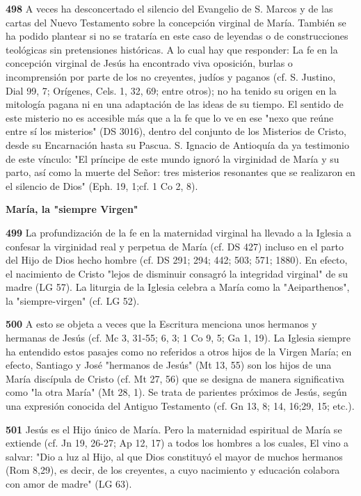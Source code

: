 \documentclass[]{article}
\begin{document}
\textbf{498} A veces ha desconcertado el silencio del Evangelio de S.
Marcos y de las cartas del Nuevo Testamento sobre la concepción virginal
de María. También se ha podido plantear si no se trataría en este caso
de leyendas o de construcciones teológicas sin pretensiones históricas.
A lo cual hay que responder: La fe en la concepción virginal de Jesús ha
encontrado viva oposición, burlas o incomprensión por parte de los no
creyentes, judíos y paganos (cf. S. Justino, Dial 99, 7; Orígenes, Cels.
1, 32, 69; entre otros); no ha tenido su origen en la mitología pagana
ni en una adaptación de las ideas de su tiempo. El sentido de este
misterio no es accesible más que a la fe que lo ve en ese "nexo que
reúne entre sí los misterios" (DS 3016), dentro del conjunto de los
Misterios de Cristo, desde su Encarnación hasta su Pascua. S. Ignacio de
Antioquía da ya testimonio de este vínculo: "El príncipe de este mundo
ignoró la virginidad de María y su parto, así como la muerte del Señor:
tres misterios resonantes que se realizaron en el silencio de Dios"
(Eph. 19, 1;cf. 1 Co 2, 8).\textbf{\\
}

\textbf{María, la "siempre Virgen"}

\textbf{499} La profundización de la fe en la maternidad virginal ha
llevado a la Iglesia a confesar la virginidad real y perpetua de María
(cf. DS 427) incluso en el parto del Hijo de Dios hecho hombre (cf. DS
291; 294; 442; 503; 571; 1880). En efecto, el nacimiento de Cristo
"lejos de disminuir consagró la integridad virginal" de su madre (LG
57). La liturgia de la Iglesia celebra a María como la "Aeiparthenos",
la "siempre-virgen" (cf. LG 52).

\textbf{500} A esto se objeta a veces que la Escritura menciona unos
hermanos y hermanas de Jesús (cf. Mc 3, 31-55; 6, 3; 1 Co 9, 5; Ga 1,
19). La Iglesia siempre ha entendido estos pasajes como no referidos a
otros hijos de la Virgen María; en efecto, Santiago y José "hermanos de
Jesús" (Mt 13, 55) son los hijos de una María discípula de Cristo (cf.
Mt 27, 56) que se designa de manera significativa como "la otra María"
(Mt 28, 1). Se trata de parientes próximos de Jesús, según una expresión
conocida del Antiguo Testamento (cf. Gn 13, 8; 14, 16;29, 15; etc.).

\textbf{501} Jesús es el Hijo único de María. Pero la maternidad
espiritual de María se extiende (cf. Jn 19, 26-27; Ap 12, 17) a todos
los hombres a los cuales, El vino a salvar: "Dio a luz al Hijo, al que
Dios constituyó el mayor de muchos hermanos (Rom 8,29), es decir, de los
creyentes, a cuyo nacimiento y educación colabora con amor de madre" (LG
63).
\end{document}

